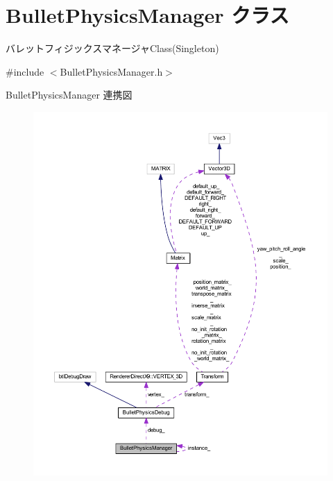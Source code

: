 \hypertarget{class_bullet_physics_manager}{}\section{Bullet\+Physics\+Manager クラス}
\label{class_bullet_physics_manager}


バレットフィジックスマネージャ\+Class(\+Singleton)  




{\ttfamily \#include $<$Bullet\+Physics\+Manager.\+h$>$}



Bullet\+Physics\+Manager 連携図\nopagebreak
\begin{figure}[H]
\begin{center}
\leavevmode
\includegraphics[width=350pt]{class_bullet_physics_manager__coll__graph}
\end{center}
\end{figure}

